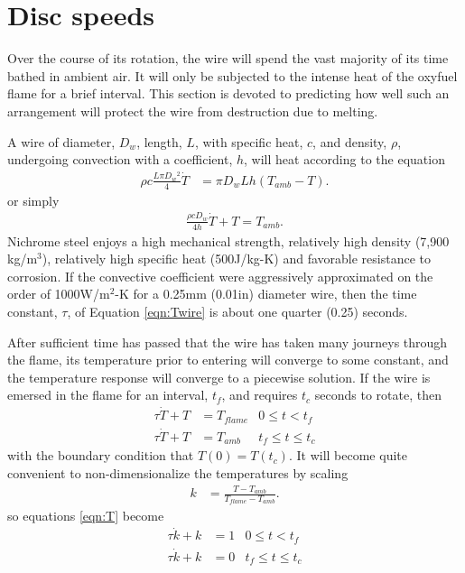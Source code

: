 \section{Disc speeds}\label{sec:temperature}

Over the course of its rotation, the wire will spend the vast majority of its time bathed in ambient air.  It will only be subjected to the intense heat of the oxyfuel flame for a brief interval.  This section is devoted to predicting how well such an arrangement will protect the wire from destruction due to melting.

A wire of diameter, $D_w$, length, $L$, with specific heat, $c$, and density, $\rho$, undergoing convection with a coefficient, $h$, will heat according to the equation
\begin{align}
\rho c \frac{L \pi D_w{^2}}{4} \dot{T} &= \pi D_w L h\left(T_{amb} - T\right).\nonumber
\end{align}
or simply
\begin{align}
\frac{\rho c D_w}{4 h} \dot{T} + T = T_{amb}.\label{eqn:Twire}
\end{align}
Nichrome steel enjoys a high mechanical strength, relatively high density (7,900 kg/m$^3$), relatively high specific heat (500J/kg-K) and favorable resistance to corrosion.  If the convective coefficient were aggressively approximated on the order of 1000W/m$^2$-K for a 0.25mm (0.01in) diameter wire, then the time constant, $\tau$, of Equation \ref{eqn:Twire} is about one quarter (0.25) seconds.

After sufficient time has passed that the wire has taken many journeys through the flame, its temperature prior to entering will converge to some constant, and the temperature response will converge to a piecewise solution.  If the wire is emersed in the flame for an interval, $t_f$, and requires $t_c$ seconds to rotate, then 
\begin{subequations}\label{eqn:T}
\begin{align}
\tau \dot{T} + T &= T_{flame} & 0 \le t < t_f\label{eqn:T:tf}\\
\tau \dot{T} + T &= T_{amb} & t_f \le t \le t_c\label{eqn:T:ta}
\end{align}
\end{subequations}
with the boundary condition that $T(0) = T(t_c)$.  It will become quite convenient to non-dimensionalize the temperatures by scaling
\begin{align}
k &= \frac{T - T_{amb}}{T_{flame} - T_{amb}}.
\end{align}
so equations \ref{eqn:T} become
\begin{subequations}
\begin{align}
\tau \dot{k} + k &= 1 & 0 \le t < t_f\label{eqn:k:tf}\\
\tau \dot{k} + k &= 0 & t_f \le t \le t_c\label{eqn:k:ta}
\end{align}
\end{subequations}

